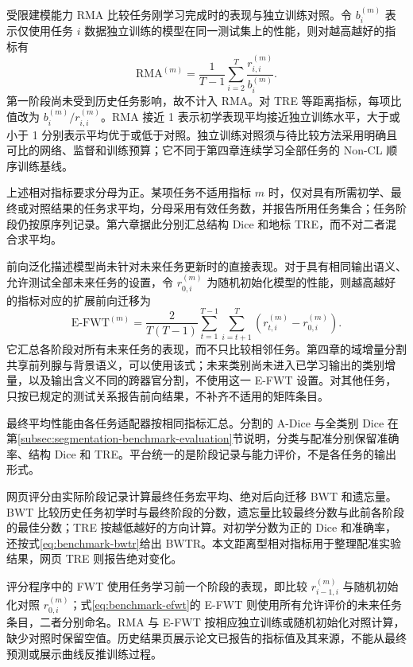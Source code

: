 受限建模能力 RMA 比较任务刚学习完成时的表现与独立训练对照。令 $b_i^{(m)}$ 表示仅使用任务 $i$ 数据独立训练的模型在同一测试集上的性能，则对越高越好的指标有
\begin{equation}
\mathrm{RMA}^{(m)}
=
\frac{1}{T-1}
\sum_{i=2}^{T}
\frac{r^{(m)}_{i,i}}{b_i^{(m)}}.
\label{eq:benchmark-rma}
\end{equation}
第一阶段尚未受到历史任务影响，故不计入 RMA。对 TRE 等距离指标，每项比值改为 $b_i^{(m)}/r^{(m)}_{i,i}$。RMA 接近 1 表示初学表现平均接近独立训练水平，大于或小于 1 分别表示平均优于或低于对照。独立训练对照须与待比较方法采用明确且可比的网络、监督和训练预算；它不同于第四章连续学习全部任务的 Non-CL 顺序训练基线。

上述相对指标要求分母为正。某项任务不适用指标 $m$ 时，仅对具有所需初学、最终或对照结果的任务求平均，分母采用有效任务数，并报告所用任务集合；任务阶段仍按原序列记录。第六章据此分别汇总结构 Dice 和地标 TRE，而不对二者混合求平均。

前向泛化描述模型尚未针对未来任务更新时的直接表现。对于具有相同输出语义、允许测试全部未来任务的设置，令 $r^{(m)}_{0,i}$ 为随机初始化模型的性能，则越高越好的指标对应的扩展前向迁移为
\begin{equation}
\mathrm{E\mbox{-}FWT}^{(m)}
=
\frac{2}{T(T-1)}
\sum_{t=1}^{T-1}
\sum_{i=t+1}^{T}
\left(r^{(m)}_{t,i}-r^{(m)}_{0,i}\right).
\label{eq:benchmark-efwt}
\end{equation}
它汇总各阶段对所有未来任务的表现，而不只比较相邻任务。第四章的域增量分割共享前列腺与背景语义，可以使用该式；未来类别尚未进入已学习输出的类别增量，以及输出含义不同的跨器官分割，不使用这一 E-FWT 设置。对其他任务，只按已规定的测试关系报告前向结果，不补齐不适用的矩阵条目。

最终平均性能由各任务适配器按相同指标汇总。分割的 A-Dice 与全类别 Dice 在第\ref{subsec:segmentation-benchmark-evaluation}节说明，分类与配准分别保留准确率、结构 Dice 和 TRE。平台统一的是阶段记录与能力评价，不是各任务的输出形式。

网页评分由实际阶段记录计算最终任务宏平均、绝对后向迁移 BWT 和遗忘量。BWT 比较历史任务初学时与最终阶段的分数，遗忘量比较最终分数与此前各阶段的最佳分数；TRE 按越低越好的方向计算。对初学分数为正的 Dice 和准确率，还按式\eqref{eq:benchmark-bwtr}给出 BWTR。本文距离型相对指标用于整理配准实验结果，网页 TRE 则报告绝对变化。

评分程序中的 FWT 使用任务学习前一个阶段的表现，即比较 $r^{(m)}_{i-1,i}$ 与随机初始化对照 $r^{(m)}_{0,i}$；式\eqref{eq:benchmark-efwt}的 E-FWT 则使用所有允许评价的未来任务条目，二者分别命名。RMA 与 E-FWT 按相应独立训练或随机初始化对照计算，缺少对照时保留空值。历史结果页展示论文已报告的指标值及其来源，不能从最终预测或展示曲线反推训练过程。

